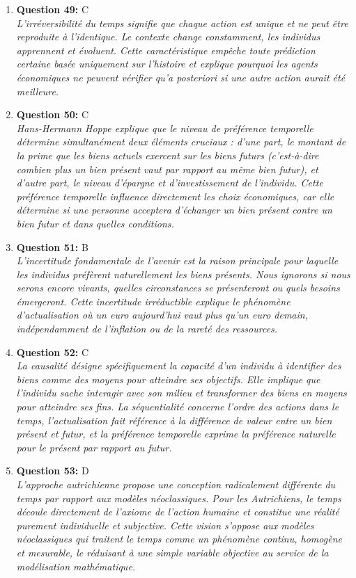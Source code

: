 \documentclass[12pt,a4paper]{article}
\begin{document}
\begin{enumerate}
\item \textbf{Question 49:} C
\\ \textit{L'irréversibilité du temps signifie que chaque action est unique et ne peut être reproduite à l'identique. Le contexte change constamment, les individus apprennent et évoluent. Cette caractéristique empêche toute prédiction certaine basée uniquement sur l'histoire et explique pourquoi les agents économiques ne peuvent vérifier qu'a posteriori si une autre action aurait été meilleure.}

\item \textbf{Question 50:} C
\\ \textit{Hans-Hermann Hoppe explique que le niveau de préférence temporelle détermine simultanément deux éléments cruciaux : d'une part, le montant de la prime que les biens actuels exercent sur les biens futurs (c'est-à-dire combien plus un bien présent vaut par rapport au même bien futur), et d'autre part, le niveau d'épargne et d'investissement de l'individu. Cette préférence temporelle influence directement les choix économiques, car elle détermine si une personne acceptera d'échanger un bien présent contre un bien futur et dans quelles conditions.}

\item \textbf{Question 51:} B
\\ \textit{L'incertitude fondamentale de l'avenir est la raison principale pour laquelle les individus préfèrent naturellement les biens présents. Nous ignorons si nous serons encore vivants, quelles circonstances se présenteront ou quels besoins émergeront. Cette incertitude irréductible explique le phénomène d'actualisation où un euro aujourd'hui vaut plus qu'un euro demain, indépendamment de l'inflation ou de la rareté des ressources.}

\item \textbf{Question 52:} C
\\ \textit{La causalité désigne spécifiquement la capacité d'un individu à identifier des biens comme des moyens pour atteindre ses objectifs. Elle implique que l'individu sache interagir avec son milieu et transformer des biens en moyens pour atteindre ses fins. La séquentialité concerne l'ordre des actions dans le temps, l'actualisation fait référence à la différence de valeur entre un bien présent et futur, et la préférence temporelle exprime la préférence naturelle pour le présent par rapport au futur.}

\item \textbf{Question 53:} D
\\ \textit{L'approche autrichienne propose une conception radicalement différente du temps par rapport aux modèles néoclassiques. Pour les Autrichiens, le temps découle directement de l'axiome de l'action humaine et constitue une réalité purement individuelle et subjective. Cette vision s'oppose aux modèles néoclassiques qui traitent le temps comme un phénomène continu, homogène et mesurable, le réduisant à une simple variable objective au service de la modélisation mathématique.}


\end{enumerate}
\end{document}
